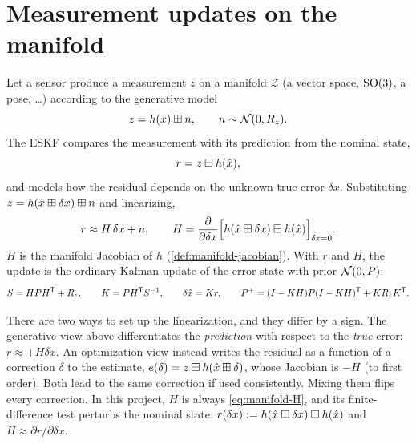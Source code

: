 \section{Measurement updates on the manifold}
\label{sec:manifold-update}

Let a sensor produce a measurement $z$ on a manifold $\mathcal{Z}$ (a vector space, $\mathrm{SO}(3)$, a pose, \dots) according to the generative model
\begin{equation}
  z = h(x)\boxplus n, \qquad n \sim \mathcal{N}(0, R_z).
\end{equation}
The ESKF compares the measurement with its prediction from the nominal state,
\begin{equation}
  r = z \boxminus h(\hat x),
  \label{eq:manifold-residual}
\end{equation}
and models how the residual depends on the unknown true error $\delta x$. Substituting $z = h(\hat x\boxplus\delta x)\boxplus n$ and linearizing,
\begin{equation}
  r \approx H\,\delta x + n, \qquad
  H = \frac{\partial}{\partial\delta x}\Big[ h(\hat x\boxplus\delta x)\boxminus h(\hat x) \Big]_{\delta x = 0}.
  \label{eq:manifold-H}
\end{equation}
$H$ is the manifold Jacobian of $h$ (\cref{def:manifold-jacobian}). With $r$ and $H$, the update is the ordinary Kalman update of the error state
with prior $\mathcal{N}(0, P)$:
\begin{equation}
  S = HPH^{\mathsf{T}} + R_z,\qquad K = PH^{\mathsf{T}} S^{-1},\qquad \delta\hat x = Kr,\qquad P^+ = (I - KH)P(I - KH)^{\mathsf{T}} + KR_zK^{\mathsf{T}}.
\end{equation}

\begin{pitfall}
There are two ways to set up the linearization, and they differ by a sign. The generative view above differentiates the \emph{prediction} with
respect to the \emph{true} error: $r \approx +H\delta x$. An optimization view instead writes the residual as a function of a correction $\delta$ to the
estimate, $e(\delta) = z\boxminus h(\hat x\boxplus\delta)$, whose Jacobian is $-H$ (to first order). Both lead to the same correction if used consistently.
Mixing them flips every correction. In this project, $H$ is always \eqref{eq:manifold-H}, and its finite-difference test perturbs the nominal state:
$r(\delta x) := h(\hat x\boxplus\delta x)\boxminus h(\hat x)$ and $H \approx \partial r/\partial\delta x$.
\end{pitfall}

